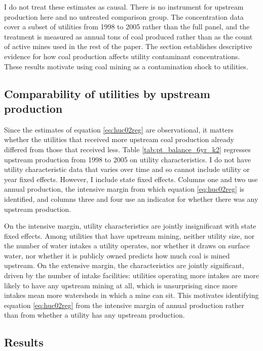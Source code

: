 \documentclass[12pt]{article}
\begin{document}

I do not treat these estimates as causal. There is no instrument for upstream production here and no untreated comparison group. The concentration data cover a subset of utilities from 1998 to 2005 rather than the full panel, and the treatment is measured as annual tons of coal produced rather than as the count of active mines used in the rest of the paper. The section establishes descriptive evidence for how coal production affects utility contaminant concentrations. These results motivate using coal mining as a contamination shock to utilities.

\subsection{Comparability of utilities by upstream production}

Since the estimates of equation \ref{eq:huc02reg} are observational, it matters whether the utilities that received more upstream coal production already differed from those that received less. Table \ref{tab:pt_balance_6yr_k2} regresses upstream production from 1998 to 2005 on utility characteristics. I do not have utility characteristic data that varies over time and so cannot include utility or year fixed effects. However, I include state fixed effects. Columns one and two use annual production, the intensive margin from which equation \ref{eq:huc02reg} is identified, and columns three and four use an indicator for whether there was any upstream production.

On the intensive margin, utility characteristics are jointly insignificant with state fixed effects. Among utilities that have upstream mining, neither utility size, nor the number of water intakes a utility operates, nor whether it draws on surface water, nor whether it is publicly owned predicts how much coal is mined upstream. On the extensive margin, the characteristics are jointly significant, driven by the number of intake facilities: utilities operating more intakes are more likely to have any upstream mining at all, which is unsurprising since more intakes mean more watersheds in which a mine can sit. This motivates identifying equation \ref{eq:huc02reg} from the intensive margin of annual production rather than from whether a utility has any upstream production.

\subsection{Results}
\end{document}
